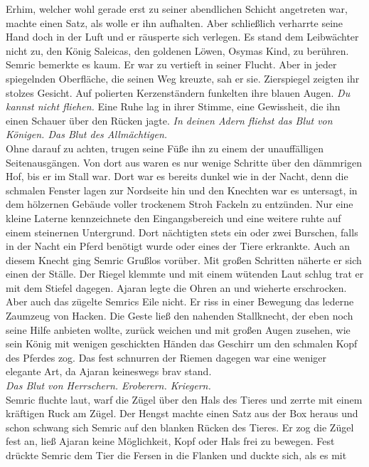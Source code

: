 Erhim, welcher wohl gerade erst zu seiner abendlichen Schicht angetreten war, machte einen Satz, 
als wolle er ihn aufhalten. Aber schließlich verharrte seine Hand doch in der Luft und er räusperte 
sich verlegen. Es stand dem Leibwächter nicht zu, den König Saleicas, den goldenen Löwen, Osymas 
Kind, zu berühren. Semric bemerkte es kaum. Er war zu vertieft in seiner Flucht. Aber in jeder 
spiegelnden Oberfläche, die seinen Weg kreuzte, sah er sie. Zierspiegel zeigten ihr stolzes 
Gesicht. Auf polierten Kerzenständern funkelten ihre blauen Augen. \textit{Du kannst nicht fliehen.} 
Eine Ruhe lag in ihrer Stimme, eine Gewissheit, die ihn einen Schauer über den Rücken jagte. 
\textit{In deinen Adern fliehst das Blut von Königen. Das Blut des Allmächtigen.}\\
Ohne darauf zu achten, trugen seine Füße ihn zu einem der unauffälligen Seitenausgängen. Von dort 
aus waren es nur wenige Schritte über den dämmrigen Hof, bis er im Stall war. Dort war es bereits 
dunkel wie in der Nacht, denn die schmalen Fenster lagen zur Nordseite hin und den Knechten war es 
untersagt, in dem hölzernen Gebäude voller trockenem Stroh Fackeln zu entzünden. Nur eine kleine 
Laterne kennzeichnete den Eingangsbereich und eine weitere ruhte auf einem steinernen Untergrund. 
Dort nächtigten stets ein oder zwei Burschen, falls in der Nacht ein Pferd benötigt wurde oder 
eines der Tiere erkrankte. Auch an diesem Knecht ging Semric Grußlos vorüber. Mit großen Schritten 
näherte er sich einen der Ställe. Der Riegel klemmte und mit einem wütenden Laut schlug trat er mit 
dem Stiefel dagegen. Ajaran legte die Ohren an und wieherte erschrocken. Aber auch das zügelte 
Semrics Eile nicht. Er riss in einer Bewegung das lederne Zaumzeug von Hacken. Die Geste ließ den 
nahenden Stallknecht, der eben noch seine Hilfe anbieten wollte, zurück weichen und mit großen 
Augen zusehen, wie sein König mit wenigen geschickten Händen das Geschirr um den schmalen Kopf des 
Pferdes zog. Das fest schnurren der Riemen dagegen war eine weniger elegante Art, da Ajaran 
keineswegs brav stand. \\
\textit{Das Blut von Herrschern. Eroberern. Kriegern.}\\
Semric fluchte laut, warf die Zügel über den Hals des Tieres und zerrte mit einem kräftigen Ruck am 
Zügel. Der Hengst machte einen Satz aus der Box heraus und schon schwang sich Semric auf den 
blanken Rücken des Tieres. Er zog die Zügel fest an, ließ Ajaran keine Möglichkeit, Kopf oder Hals  
frei zu bewegen. Fest drückte Semric dem Tier die Fersen in die Flanken und duckte sich, als es mit 
